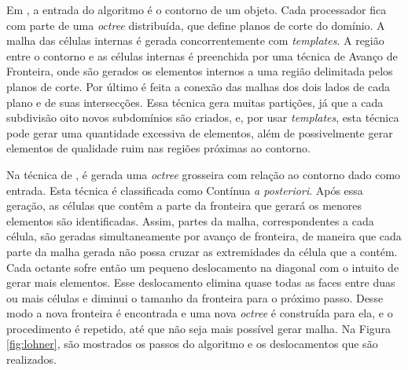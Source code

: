 Em \cite{bib:deCougny99}, a entrada do algoritmo é o contorno de um objeto. Cada processador fica com parte de uma \textit{octree} distribuída, que define planos de corte do domínio. A malha das células internas é gerada concorrentemente com \textit{templates}. A região entre o contorno e as células internas é preenchida por uma técnica de Avanço de Fronteira, onde são gerados os elementos internos a uma região delimitada pelos planos de corte. Por último é feita a conexão das malhas dos dois lados de cada plano e de suas intersecções. Essa técnica gera muitas partições, já que a cada subdivisão oito novos subdomínios são criados, e, por usar \textit{templates}, esta técnica pode gerar uma quantidade excessiva de elementos, além de possivelmente gerar elementos de qualidade ruim nas regiões próximas ao contorno.

Na técnica de \cite{bib:Lohner01}, é gerada uma \textit{octree} grosseira com relação ao contorno dado como entrada. Esta técnica é classificada como Contínua \textit{a posteriori}. Após essa geração, as células que contêm a parte da fronteira que gerará os menores elementos são identificadas. Assim, partes da malha, correspondentes a cada célula, são geradas simultaneamente por avanço de fronteira, de maneira que cada parte da malha gerada não possa cruzar as extremidades da célula que a contém. Cada octante sofre então um pequeno deslocamento na diagonal com o intuito de gerar mais elementos. Esse deslocamento elimina quase todas as faces entre duas ou mais células e diminui o tamanho da fronteira para o próximo passo. Desse modo a nova fronteira é encontrada e uma nova \textit{octree} é construída para ela, e o procedimento é repetido, até que não seja mais possível gerar malha. Na Figura \ref{fig:lohner}, são mostrados os passos do algoritmo e os deslocamentos que são realizados.


